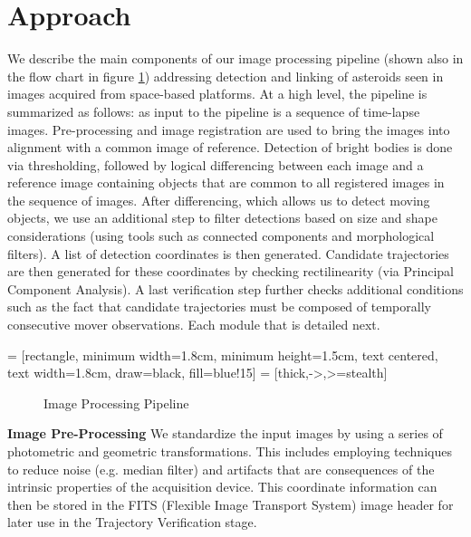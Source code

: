 \documentclass{article}
\begin{document}
\section{Approach}
\label{sec:approach}

We describe the main components of our image processing pipeline (shown also in the flow chart in figure \ref{IPP}) addressing detection and linking of asteroids seen in images acquired from space-based platforms.  At a high level, the pipeline is summarized as follows: as input to the pipeline is a sequence of time-lapse images. Pre-processing and image registration are used to bring the images into alignment with a common image of reference.  Detection of bright bodies is done via thresholding, followed by logical differencing between each image and a reference image containing objects that are common to all registered images in the sequence of images.  After differencing, which allows us to detect moving objects, we use an additional step to filter detections based on size and shape considerations (using tools such as connected components and morphological filters).  A list of detection coordinates is then generated.  Candidate trajectories are then generated for these coordinates by checking rectilinearity (via Principal Component Analysis).  A last verification step further checks additional conditions such as the fact that candidate trajectories must be composed of temporally consecutive mover observations.  Each module that is detailed next. 

 = [rectangle, minimum width=1.8cm, minimum height=1.5cm, text centered, text width=1.8cm, draw=black, fill=blue!15]
 = [thick,->,>=stealth]
\begin{figure}[b]
\vspace{-0.7cm}
\caption{Image Processing Pipeline}
\label{IPP}
\end{figure}

{\bf Image Pre-Processing}
We standardize the input images by using a series of photometric and geometric transformations.  This includes employing techniques to reduce noise (e.g. median filter) and artifacts that are consequences of the intrinsic properties of the acquisition device.   This coordinate information can then be stored in the FITS (Flexible Image Transport System) image header for later use in the Trajectory Verification stage.
\end{document}
